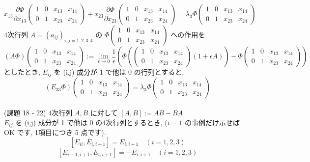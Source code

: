 \documentclass{article}
\begin{document}
\[ x_{13} \frac{\partial \Phi}{\partial x_{13}} \begin{pmatrix}
  1 & 0 & x_{13} & x_{14} \\
  0 & 1 & x_{23} & x_{24}
\end{pmatrix} + x_{23} \frac{\partial \Phi}{\partial x_{23}} \begin{pmatrix}
  1 & 0 & x_{13} & x_{14} \\
  0 & 1 & x_{23} & x_{24}
\end{pmatrix}= \lambda_3 \Phi \begin{pmatrix}
  1 & 0 & x_{13} & x_{14} \\
  0 & 1 & x_{23} & x_{24}
\end{pmatrix}\]
4次行列 $A = (a_{ij})_{i,j = 1,2,3,4}$ の $\Phi\begin{pmatrix}
  1 & 0 & x_{13} & x_{14} \\
  0 & 1 & x_{23} & x_{24}
\end{pmatrix}$ への作用を
\[ (A\Phi) \begin{pmatrix}
  1 & 0 & x_{13} & x_{14} \\
  0 & 1 & x_{23} & x_{24}
\end{pmatrix} := \lim_{\epsilon \to 0} \frac{1}{\epsilon} \left( \Phi \left( \begin{pmatrix}
  1 & 0 & x_{13} & x_{14} \\
  0 & 1 & x_{23} & x_{24} 
\end{pmatrix} (1 + \epsilon A) \right) - \Phi \begin{pmatrix}
  1 & 0 & x_{13} & x_{14} \\
  0 & 1 & x_{23} & x_{24} 
\end{pmatrix} \right) \]
としたとき,
$E_{ij}$ を (i,j) 成分が 1 で他は 0 の行列とすると,
\[ (E_{33} \Phi) \begin{pmatrix}
  1 & 0 & x_{13} & x_{14} \\
  0 & 1 & x_{23} & x_{24}
\end{pmatrix} = \lambda_3 \Phi \begin{pmatrix}
  1 & 0 & x_{13} & x_{14} \\
  0 & 1 & x_{23} & x_{24}
\end{pmatrix} \]
\\
(課題 18 - 22) 4次行列 $A,B$ に対して $[A,B] := AB - BA$\\
$E_{ij}$ を (i,j) 成分が 1 で他は 0 の4次行列とするとき, ($i=1$ の事例だけ示せば OK です, 1項目につき 5 点です).\\
\[ [E_{ii}, E_{i,i+1}] = E_{i,i+1} \quad (i=1,2,3) \]
\[ [E_{i+1,i+1}, E_{i,i+1}] = -E_{i,i+1} \quad (i=1,2,3) \]
\end{document}
